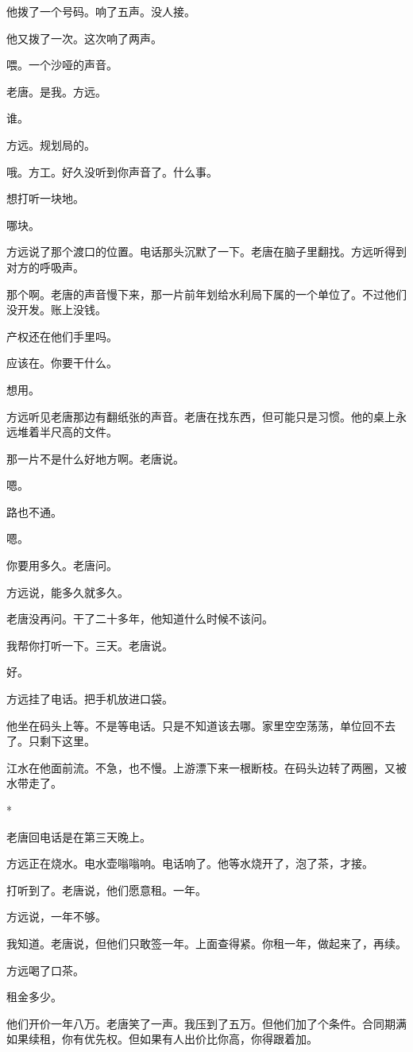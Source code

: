 \documentclass[UTF8,a5paper,11pt,openany]{ctexbook}
\newcommand{\scene}{\vspace{1em}\begin{center}*\quad*\quad*\end{center}\vspace{0.5em}}
\begin{document}
他拨了一个号码。响了五声。没人接。

他又拨了一次。这次响了两声。

喂。一个沙哑的声音。

老唐。是我。方远。

谁。

方远。规划局的。

哦。方工。好久没听到你声音了。什么事。

想打听一块地。

哪块。

方远说了那个渡口的位置。电话那头沉默了一下。老唐在脑子里翻找。方远听得到对方的呼吸声。

那个啊。老唐的声音慢下来，那一片前年划给水利局下属的一个单位了。不过他们没开发。账上没钱。

产权还在他们手里吗。

应该在。你要干什么。

想用。

方远听见老唐那边有翻纸张的声音。老唐在找东西，但可能只是习惯。他的桌上永远堆着半尺高的文件。

那一片不是什么好地方啊。老唐说。

嗯。

路也不通。

嗯。

你要用多久。老唐问。

方远说，能多久就多久。

老唐没再问。干了二十多年，他知道什么时候不该问。

我帮你打听一下。三天。老唐说。

好。

方远挂了电话。把手机放进口袋。

他坐在码头上等。不是等电话。只是不知道该去哪。家里空空荡荡，单位回不去了。只剩下这里。

江水在他面前流。不急，也不慢。上游漂下来一根断枝。在码头边转了两圈，又被水带走了。


\scene

老唐回电话是在第三天晚上。

方远正在烧水。电水壶嗡嗡响。电话响了。他等水烧开了，泡了茶，才接。

打听到了。老唐说，他们愿意租。一年。

方远说，一年不够。

我知道。老唐说，但他们只敢签一年。上面查得紧。你租一年，做起来了，再续。

方远喝了口茶。

租金多少。

他们开价一年八万。老唐笑了一声。我压到了五万。但他们加了个条件。合同期满如果续租，你有优先权。但如果有人出价比你高，你得跟着加。
\end{document}
